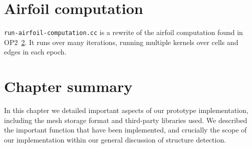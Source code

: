 \section{Airfoil computation}
\texttt{run-airfoil-computation.cc} is a rewrite of the airfoil computation found in OP2~\ref{}. It runs over many iterations, running multiple kernels over cells and edges in each epoch.


\section{Chapter summary}
In this chapter we detailed important aspects of our prototype implementation, including the mesh storage format and third-party libraries used. We described the important function that have been implemented, and crucially the scope of our implementation within our general discussion of structure detection.
